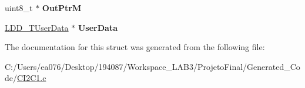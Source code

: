 \begin{DoxyCompactItemize}
\item 
\hypertarget{struct_c_i2_c1___t_device_data_a4ea11f7981c1714e0e8d9ec29f19f28d}{uint8\-\_\-t $\ast$ {\bfseries Out\-Ptr\-M}}\label{struct_c_i2_c1___t_device_data_a4ea11f7981c1714e0e8d9ec29f19f28d}

\item 
\hypertarget{struct_c_i2_c1___t_device_data_a124049938e14d429927032a09c239dd2}{\hyperlink{group___p_e___types__module_ga0b66a73f87238a782318aa0be7578e35}{L\-D\-D\-\_\-\-T\-User\-Data} $\ast$ {\bfseries User\-Data}}\label{struct_c_i2_c1___t_device_data_a124049938e14d429927032a09c239dd2}

\end{DoxyCompactItemize}


The documentation for this struct was generated from the following file\-:\begin{DoxyCompactItemize}
\item 
C\-:/\-Users/ea076/\-Desktop/194087/\-Workspace\-\_\-\-L\-A\-B3/\-Projeto\-Final/\-Generated\-\_\-\-Code/\hyperlink{_c_i2_c1_8c}{C\-I2\-C1.\-c}\end{DoxyCompactItemize}
